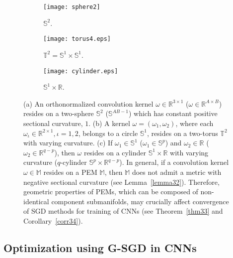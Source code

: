 \documentclass[10pt,journal,compsoc]{IEEEtran}
\theoremstyle{definition}
\theoremstyle{definition}
\theoremstyle{remark}
\theoremstyle{remark}
\theoremstyle{remark}
\begin{document}
\begin{figure}[t!]
	\centering
	\begin{subfigure}[b]{0.15\textwidth}		
		\label{fig:sphere}%
		\texttt{[image: sphere2]}%
		\caption{$\mathbb{S}^2$.}
	\end{subfigure}
	\begin{subfigure}[b]{0.15\textwidth}		
		\label{fig:torus}%
		\texttt{[image: torus4.eps]}%
		\caption{$\mathbb{T}^2 = \mathbb{S}^1 \times \mathbb{S}^1$.}
	\end{subfigure}
	\begin{subfigure}[b]{0.15\textwidth}
		\label{fig:cylinder}%
		\texttt{[image: cylinder.eps]}%
		\caption{$\mathbb{S}^1 \times \mathbb{R}$.}
	\end{subfigure}
	\caption{(a) An orthonormalized convolution kernel ${\omega \in \mathbb{R}^{3 \times 1} }$ (${\omega \in \mathbb{R}^{A \times B}}$) resides on a two-sphere $\mathbb{S}^2$ ($\mathbb{S}^{AB-1}$) which has constant positive sectional curvature, $1$. (b) A kernel $\omega = (\omega_1, \omega_2)$, where each $\omega_{\iota} \in \mathbb{R}^{2 \times 1}, \iota = 1,2$, belongs to a circle $\mathbb{S}^1$, resides on a two-torus $\mathbb{T}^2$ with varying curvature. (c) If $\omega_{1} \in \mathbb{S}^{1}$ ($\omega_{1} \in \mathbb{S}^{p}$) and $\omega_{2} \in \mathbb{R}$ ($\omega_{2} \in \mathbb{R}^{q-p}$), then $\omega$ resides on a cylinder $\mathbb{S}^1 \times \mathbb{R}$ with varying curvature ($q$-cylinder $\mathbb{S}^p \times \mathbb{R}^{q-p}$). In general, if a convolution kernel $\omega \in \mathbb{M}$ resides on a PEM $\mathbb{M}$, then $\mathbb{M}$ does not admit a metric with negative sectional curvature (see Lemma~\ref{lemma32}). Therefore, geometric properties of PEMs, which can be composed of non-identical component submanifolds, may crucially affect convergence of SGD methods for training of CNNs  (see Theorem~\ref{thm33} and Corollary~\ref{corr34}). }
	\label{fig1}
\end{figure}

\subsection{Optimization using G-SGD in CNNs}
\end{document}
